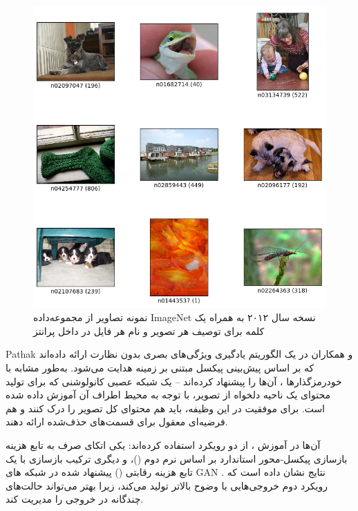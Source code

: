 \begin{figure}
	\centering
	\includegraphics[width=0.7\linewidth]{imagenet2012-1}
	\caption{نمونه تصاویر از مجموعه‌داده
		ImageNet
		نسخه سال ۲۰۱۲ به همراه یک کلمه برای توصیف هر تصویر و نام هر فایل در داخل پرانتز}
	\label{fig:imagenet2012-1}
\end{figure}


Pathak
و همکاران در \cite{pathakContextEncodersFeature2016}
یک الگوریتم یادگیری ویژگی‌های بصری بدون نظارت  ارائه داده‌اند که بر اساس پیش‌بینی پیکسل مبتنی بر زمینه هدایت می‌شود. به‌طور مشابه با خودرمزگذارها
، آن‌ها  را پیشنهاد کرده‌اند – یک شبکه عصبی کانولوشنی که برای تولید محتوای یک ناحیه دلخواه از تصویر، با توجه به محیط اطراف آن آموزش داده شده است. برای موفقیت در این وظیفه،  باید هم محتوای کل تصویر را درک کنند و هم فرضیه‌ای معقول برای قسمت‌های حذف‌شده ارائه دهند.  

آن‌ها در آموزش ،‌ از دو رویکرد استفاده کرده‌اند: یکی اتکای صرف به تابع هزینه بازسازی پیکسل-محور استاندارد بر اساس نرم دوم ()، و دیگری ترکیب بازسازی با یک تابع هزینه رقابتی () پیشنهاد شده در شبکه های GAN
\cite{goodfellowGenerativeAdversarialNetworks2014}.
نتایج نشان داده است که رویکرد دوم خروجی‌هایی با وضوح بالاتر تولید می‌کند، زیرا بهتر می‌تواند حالت‌های چندگانه در خروجی را مدیریت کند.  

